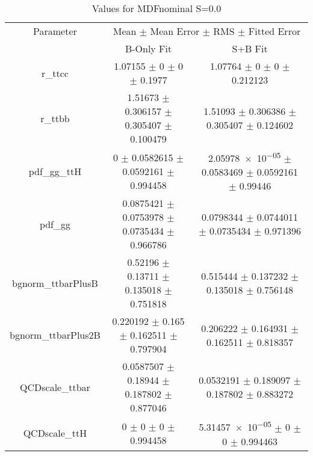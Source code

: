 \begin{table}
\centering
\caption{Values for MDFnominal S=0.0}
\begin{tabular}{ccc}
\toprule
Parameter & \multicolumn{2}{c}{Mean $\pm$ Mean Error $\pm$ RMS $\pm$ Fitted Error}\\
 & B-Only Fit & S+B Fit\\
\midrule
r\_ttcc & \num{1.07155} $\pm$ \num{0} $\pm$ \num{0} $\pm$ \num{0.1977} & \num{1.07764} $\pm$ \num{0} $\pm$ \num{0} $\pm$ \num{0.212123}\\
r\_ttbb & \num{1.51673} $\pm$ \num{0.306157} $\pm$ \num{0.305407} $\pm$ \num{0.100479} & \num{1.51093} $\pm$ \num{0.306386} $\pm$ \num{0.305407} $\pm$ \num{0.124602}\\
pdf\_gg\_ttH & \num{0} $\pm$ \num{0.0582615} $\pm$ \num{0.0592161} $\pm$ \num{0.994458} & \num{2.05978e-05} $\pm$ \num{0.0583469} $\pm$ \num{0.0592161} $\pm$ \num{0.99446}\\
pdf\_gg & \num{0.0875421} $\pm$ \num{0.0753978} $\pm$ \num{0.0735434} $\pm$ \num{0.966786} & \num{0.0798344} $\pm$ \num{0.0744011} $\pm$ \num{0.0735434} $\pm$ \num{0.971396}\\
bgnorm\_ttbarPlusB & \num{0.52196} $\pm$ \num{0.13711} $\pm$ \num{0.135018} $\pm$ \num{0.751818} & \num{0.515444} $\pm$ \num{0.137232} $\pm$ \num{0.135018} $\pm$ \num{0.756148}\\
bgnorm\_ttbarPlus2B & \num{0.220192} $\pm$ \num{0.165} $\pm$ \num{0.162511} $\pm$ \num{0.797904} & \num{0.206222} $\pm$ \num{0.164931} $\pm$ \num{0.162511} $\pm$ \num{0.818357}\\
QCDscale\_ttbar & \num{0.0587507} $\pm$ \num{0.18944} $\pm$ \num{0.187802} $\pm$ \num{0.877046} & \num{0.0532191} $\pm$ \num{0.189097} $\pm$ \num{0.187802} $\pm$ \num{0.883272}\\
QCDscale\_ttH & \num{0} $\pm$ \num{0} $\pm$ \num{0} $\pm$ \num{0.994458} & \num{5.31457e-05} $\pm$ \num{0} $\pm$ \num{0} $\pm$ \num{0.994463}\\
\bottomrule
\end{tabular}
\end{table}